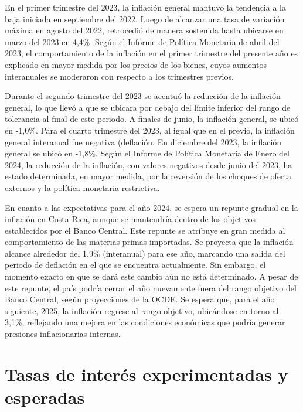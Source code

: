 \documentclass[
]{article}
\begin{document}
En el primer trimestre del 2023, la inflación general mantuvo la
tendencia a la baja iniciada en septiembre del 2022. Luego de alcanzar
una tasa de variación máxima en agosto del 2022, retrocedió de manera
sostenida hasta ubicarse en marzo del 2023 en 4,4\%. Según el Informe de
Política Monetaria de abril del 2023, el comportamiento de la inflación
en el primer trimestre del presente año es explicado en mayor medida por
los precios de los bienes, cuyos aumentos interanuales se moderaron con
respecto a los trimestres previos.

Durante el segundo trimestre del 2023 se acentuó la reducción de la
inflación general, lo que llevó a que se ubicara por debajo del límite
inferior del rango de tolerancia al final de este periodo. A finales de
junio, la inflación general, se ubicó en -1,0\%. Para el cuarto
trimestre del 2023, al igual que en el previo, la inflación general
interanual fue negativa (deflación. En diciembre del 2023, la inflación
general se ubicó en -1,8\%. Según el Informe de Política Monetaria de
Enero del 2024, la reducción de la inflación, con valores negativos
desde junio del 2023, ha estado determinada, en mayor medida, por la
reversión de los choques de oferta externos y la política monetaria
restrictiva.

En cuanto a las expectativas para el año 2024, se espera un repunte
gradual en la inflación en Costa Rica, aunque se mantendría dentro de
los objetivos establecidos por el Banco Central. Este repunte se
atribuye en gran medida al comportamiento de las materias primas
importadas. Se proyecta que la inflación alcance alrededor del 1,9\%
(interanual) para ese año, marcando una salida del periodo de deflación
en el que se encuentra actualmente. Sin embargo, el momento exacto en
que se dará este cambio aún no está determinado. A pesar de este
repunte, el país podría cerrar el año nuevamente fuera del rango
objetivo del Banco Central, según proyecciones de la OCDE. Se espera
que, para el año siguiente, 2025, la inflación regrese al rango
objetivo, ubicándose en torno al 3,1\%, reflejando una mejora en las
condiciones económicas que podría generar presiones inflacionarias
internas.

\hypertarget{tasas-de-interuxe9s-experimentadas-y-esperadas}{%
\section{Tasas de interés experimentadas y
esperadas}\label{tasas-de-interuxe9s-experimentadas-y-esperadas}}
\end{document}
